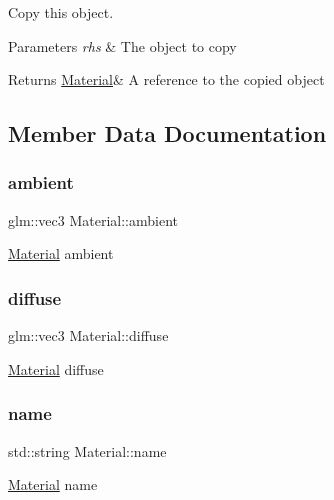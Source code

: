Copy this object. 


\begin{DoxyParams}{Parameters}
{\em rhs} & The object to copy \\
\hline
\end{DoxyParams}
\begin{DoxyReturn}{Returns}
\hyperlink{class_material}{Material}\& A reference to the copied object 
\end{DoxyReturn}


\subsection{Member Data Documentation}
\mbox{\label{class_material_af99c823542e497c98a35d1aac5fc9012}} 
\subsubsection{\texorpdfstring{ambient}{ambient}}
{\footnotesize\ttfamily glm\+::vec3 Material\+::ambient}

\hyperlink{class_material}{Material} ambient \mbox{\label{class_material_a099904e2f5a7bbec3cba6bf8ec546b11}} 
\subsubsection{\texorpdfstring{diffuse}{diffuse}}
{\footnotesize\ttfamily glm\+::vec3 Material\+::diffuse}

\hyperlink{class_material}{Material} diffuse \mbox{\label{class_material_affe06990f884293d0fe2f39110f71730}} 
\subsubsection{\texorpdfstring{name}{name}}
{\footnotesize\ttfamily std\+::string Material\+::name}

\hyperlink{class_material}{Material} name \mbox{\label{class_material_a9dc184c883ec135ace28c1917af3fe84}} 
